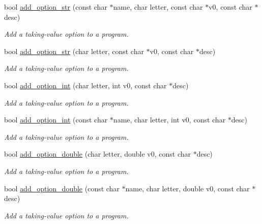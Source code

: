 {\bf }\par
\begin{DoxyCompactItemize}
\item 
bool \hyperlink{class_anyarg_ad97ec66af7ef981b51baa6d16655f3f2}{add\-\_\-option\-\_\-str} (const char $\ast$name, char letter, const char $\ast$v0, const char $\ast$desc)
\begin{DoxyCompactList}\small\item\em Add a taking-\/value option to a program. \end{DoxyCompactList}\item 
bool \hyperlink{class_anyarg_a910a657d64f414ae3a97f1e2c88ff22c}{add\-\_\-option\-\_\-str} (char letter, const char $\ast$v0, const char $\ast$desc)
\begin{DoxyCompactList}\small\item\em Add a taking-\/value option to a program. \end{DoxyCompactList}\item 
bool \hyperlink{class_anyarg_a8bf10dd45f72141ac538bc36d8c90e3e}{add\-\_\-option\-\_\-int} (char letter, int v0, const char $\ast$desc)
\begin{DoxyCompactList}\small\item\em Add a taking-\/value option to a program. \end{DoxyCompactList}\item 
bool \hyperlink{class_anyarg_ad4202a063412042e9bcde266b78df741}{add\-\_\-option\-\_\-int} (const char $\ast$name, char letter, int v0, const char $\ast$desc)
\begin{DoxyCompactList}\small\item\em Add a taking-\/value option to a program. \end{DoxyCompactList}\item 
bool \hyperlink{class_anyarg_a616fa92a586900e277bfc6222428f544}{add\-\_\-option\-\_\-double} (char letter, double v0, const char $\ast$desc)
\begin{DoxyCompactList}\small\item\em Add a taking-\/value option to a program. \end{DoxyCompactList}\item 
bool \hyperlink{class_anyarg_ad5f726956b9525fce547f359bbdcddfc}{add\-\_\-option\-\_\-double} (const char $\ast$name, char letter, double v0, const char $\ast$desc)
\begin{DoxyCompactList}\small\item\em Add a taking-\/value option to a program. \end{DoxyCompactList}\end{DoxyCompactItemize}

